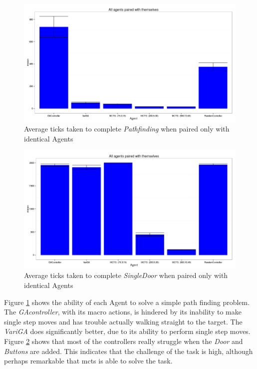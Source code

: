 \documentclass{IEEEtran}
\begin{document}
\begin{figure}[!t]
\centering
\includegraphics[width=\linewidth]{level1E-txt-pairs-ticks}
\caption{Average ticks taken to complete \emph{Pathfinding} when paired only with identical Agents}
\label{1epairedTicks}
\end{figure}

\begin{figure}[!t]
\centering
\includegraphics[width=\linewidth]{level1-txt-pairs-ticks}
\caption{Average ticks taken to complete \emph{SingleDoor} when paired only with identical Agents}
\label{1pairedTicks}
\end{figure}

Figure \ref{1epairedTicks} shows the ability of each Agent to solve a simple path finding problem. The \emph{GAcontroller}, with its macro actions, is hindered by its inability to make single step moves and has trouble actually walking straight to the target. The \emph{VariGA} does significantly better, due to its ability to perform single step moves. Figure \ref{1pairedTicks} shows that most of the controllers really struggle when the \emph{Door} and \emph{Buttons} are added. This indicates that the challenge of the task is high, although perhaps remarkable that \gls{mcts} is able to solve the task.
\end{document}
